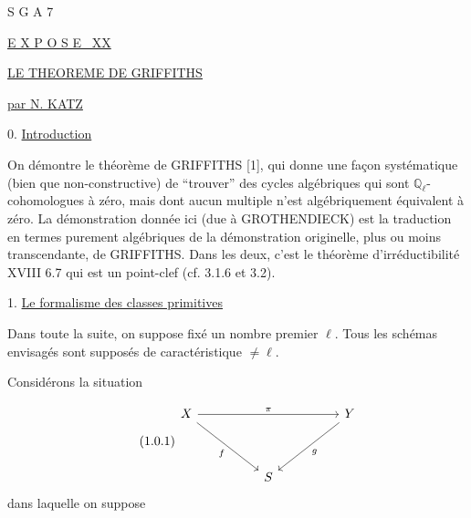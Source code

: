 


S G A 7


\underline{E X P O S E \ XX}


\underline{\underline{LE THEOREME DE GRIFFITHS}}


\underline{par N. KATZ}


0. \underline{Introduction}

On démontre le théorème de GRIFFITHS [1], qui donne une façon systématique (bien que non-constructive) de ``trouver'' des cycles algébriques qui sont $\mathbb{Q}_\ell$-cohomologues à zéro, mais dont aucun multiple n'est algébriquement équivalent à zéro. La démonstration donnée ici (due à GROTHENDIECK) est la traduction en termes purement algébriques de la démonstration originelle, plus ou moins transcendante, de GRIFFITHS. Dans les deux, c'est le théorème d'irréductibilité XVIII 6.7 qui est un point-clef (cf. 3.1.6 et 3.2).


1. \underline{Le formalisme des classes primitives}

Dans toute la suite, on suppose fixé un nombre premier $\ell$. Tous les schémas envisagés sont supposés de caractéristique $\neq \ell$.

Considérons la situation

\begin{equation}\tag{1.0.1}
\begin{tikzcd}[column sep=huge, row sep=huge]
X \arrow[rr, "\pi"] \arrow[dr, "f"'] & {} & Y \arrow[dl, "g"] \\
{} & S &
{} \end{tikzcd}
\end{equation}
dans laquelle on suppose 


